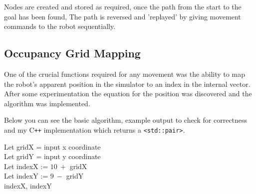 \documentclass[a4paper,12pt]{article}
\begin{document}
Nodes are created and stored as required, once the path from the start to the goal has been found, The path is reversed and 'replayed' by giving movement commands to the robot sequentially.
\subsection{Occupancy Grid Mapping}
One of the crucial functions required for any movement was the ability to map the robot's apparent position in the simulator to an index in the internal vector. After some experimentation the equation for the position was discovered and the algorithm was implemented. 

Below you can see the basic algorithm, example output to check for correctness and my C\texttt{++} implementation which returns a \texttt{<std::pair>}.

\begin{mdframed}
    \begin{minipage}[t]{.5\textwidth}
            \vspace{0.2cm}
        \small
        \begin{algorithm}[H]
            \DontPrintSemicolon
            \SetAlgoLined
                \hspace{0.6cm}Let gridX = input x coordinate\\
                \hspace{0.5cm} Let gridY = input y coordinate\\
                \vspace{0.3cm}
                \hspace{0.5cm} Let indexX := $10\:+$ gridX\\
                \hspace{0.5cm} Let indexY := $9\:-$ gridY\\
                \vspace{0.3cm}
                \hspace{0.6cm}\Return indexX, indexY\;
        \end{algorithm}
        \normalsize
    \end{minipage}
    \begin{minipage}[t]{.5\textwidth}
            \small
            \vspace{0.2cm}
            
            \normalsize
    \end{minipage}
\end{mdframed}
\end{document}
